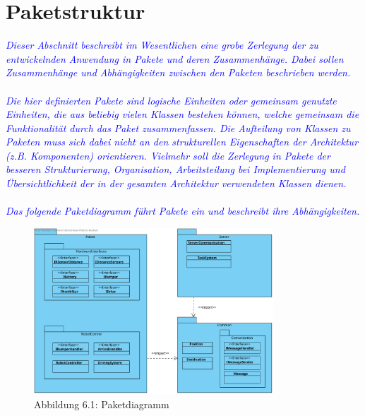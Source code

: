 \section{Paketstruktur}
\textcolor{blue}{\textit{Dieser Abschnitt beschreibt im Wesentlichen eine grobe Zerlegung der zu entwickelnden Anwendung in Pakete und deren Zusammenhänge. Dabei sollen Zusammenhänge und Abhängigkeiten zwischen den Paketen beschrieben werden.\\\\
Die hier definierten Pakete sind logische Einheiten oder gemeinsam genutzte Einheiten, die aus beliebig vielen Klassen bestehen können, welche gemeinsam die Funktionalität durch das Paket zusammenfassen. Die Aufteilung von Klassen zu Paketen muss sich dabei nicht an den strukturellen Eigenschaften der Architektur (z.B. Komponenten) orientieren. Vielmehr soll die Zerlegung in Pakete der besseren Strukturierung, Organisation, Arbeitsteilung bei Implementierung und Übersichtlichkeit der in der gesamten Architektur verwendeten Klassen dienen.\\\\
Das folgende Paketdiagramm führt Pakete ein und beschreibt ihre Abhängigkeiten. 
}}

\begin{figure}[H]
\centering
\includegraphics[width=0.8\textwidth]{../images/Iteration0_Entwurf_6_Paketdiagramm.svg}
\caption{Abbildung 6.1: Paketdiagramm}
\label{Paketstruktur}
\end{figure}
